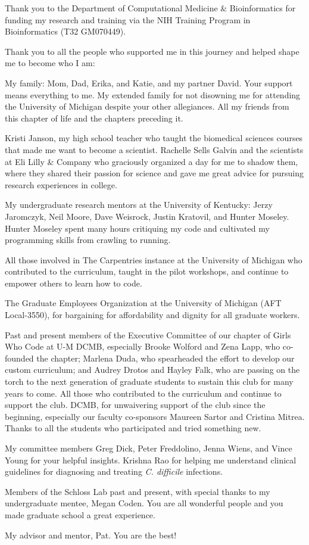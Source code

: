 Thank you to the Department of Computational Medicine \& Bioinformatics for
funding my research and training via the NIH Training Program in Bioinformatics
(T32 GM070449).

Thank you to all the people who supported me in this journey and helped shape me
to become who I am:

My family: Mom, Dad, Erika, and Katie, and my partner David.
Your support means everything to me.
My extended family for not disowning me for attending the University of Michigan
despite your other allegiances.
All my friends from this chapter of life and the chapters preceding it.

Kristi Janson, my high school teacher who taught the biomedical sciences
courses that made me want to become a scientist.
Rachelle Sells Galvin and the scientists at Eli Lilly \& Company
who graciously organized a day for me to shadow them,
where they shared their passion for science and gave me great advice for
pursuing research experiences in college.

My undergraduate research mentors at the University of Kentucky:
Jerzy Jaromczyk, Neil Moore, Dave Weisrock, Justin Kratovil, and Hunter Moseley.
Hunter Moseley spent many hours critiquing my code and cultivated my programming
skills from crawling to running.

All those involved in The Carpentries instance at the University of Michigan who
contributed to the curriculum, taught in the pilot workshops, and continue to
empower others to learn how to code.

The Graduate Employees Organization at the University of Michigan (AFT Local-3550),
for bargaining for affordability and dignity for all graduate workers.

Past and present members of the Executive Committee of
our chapter of Girls Who Code at U-M DCMB, especially
Brooke Wolford and Zena Lapp, who co-founded the chapter;
Marlena Duda, who spearheaded the effort to develop our custom curriculum; and
Audrey Drotos and Hayley Falk, who are passing on the torch to the next
generation of graduate students to sustain this club for many years to come.
All those who contributed to the curriculum and continue to support the club.
DCMB, for unwaivering support of the club since the beginning, especially our
faculty co-sponsors Maureen Sartor and Cristina Mitrea.
Thanks to all the students who participated and tried something new.

My committee members Greg Dick, Peter Freddolino, Jenna Wiens, and Vince Young
for your helpful insights.
Krishna Rao for helping me understand clinical guidelines for diagnosing
and treating \textit{C. difficile} infections.

Members of the Schloss Lab past and present, with special thanks to my
undergraduate mentee, Megan Coden.
You are all wonderful people and you made graduate school a great experience.

My advisor and mentor, Pat. You are the best!
